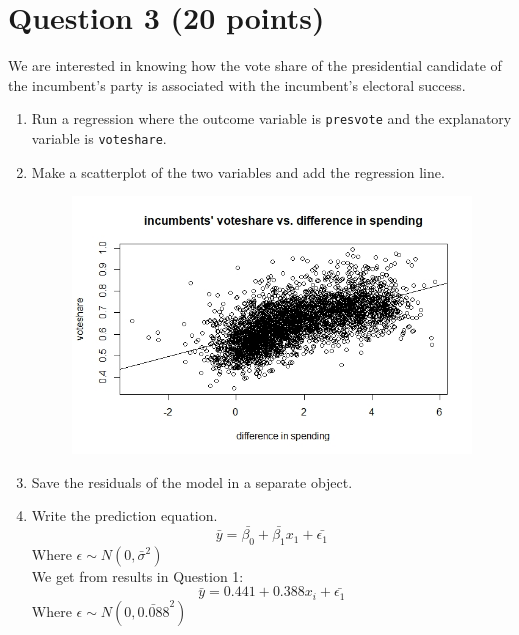 \documentclass[12pt,letterpaper]{article}
\begin{document}
	\newpage
	
\section*{Question 3 (20 points)}

\noindent We are interested in knowing how the vote share of the presidential candidate of the incumbent's party is associated with the incumbent's electoral success.
	\vspace{.25cm}

\begin{enumerate}
	\item Run a regression where the outcome variable is \texttt{presvote} and the explanatory variable is \texttt{voteshare}.
	
	
	\vspace{.5cm}
	
	\item Make a scatterplot of the two variables and add the regression line.
	\begin{figure}[h!]
		\label{figure3}
		\includegraphics[width=\textwidth]{Q1.jpeg}
	\end{figure}		
	\vspace{.5cm}
	\item Save the residuals of the model in a separate object.
	
	\vspace{.5cm}		
	\item Write the prediction equation.
	$$\bar{y} = \bar{\beta_0} + \bar{\beta_1}x_1 + \bar{\epsilon_1}$$ Where $\epsilon \sim N(0, \bar{\sigma}^2)$
	\vspace{.5cm}		
	\\We get from results in Question 1:
	$$\bar{y} = 0.441 + 0.388x_i + \bar{\epsilon_1}$$ Where $\epsilon \sim N(0, \bar{0.088}^2)$
\end{enumerate}	
\end{document}
